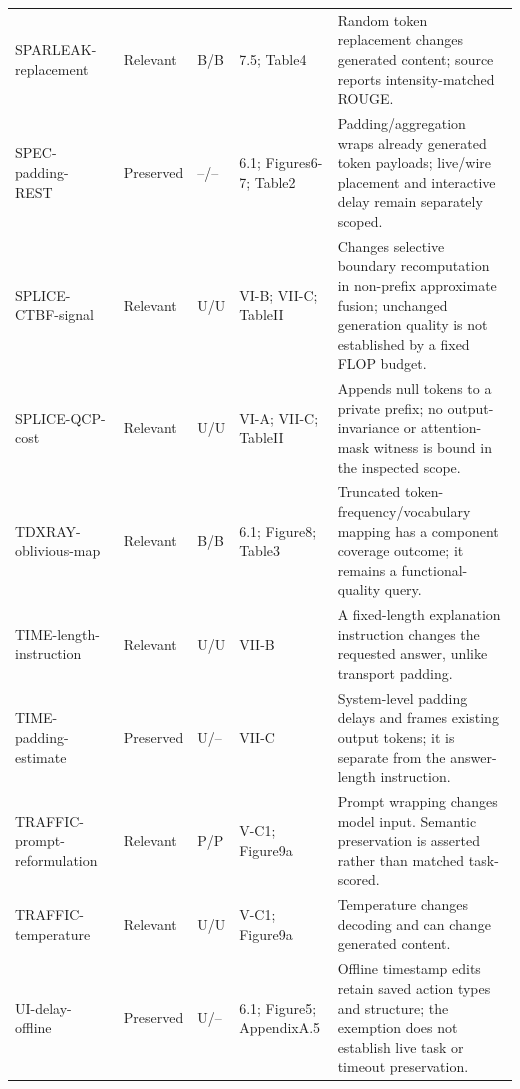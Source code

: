 \begin{longtable}{@{}p{}p{}p{}p{}p{}@{}}
SPARLEAK-\allowbreak{}replacement~\cite{chen2026sparleak} & Relevant & B/B & 7.5; Table4 & Random token replacement changes generated content; source reports intensity-matched ROUGE.\\
SPEC-\allowbreak{}padding-\allowbreak{}REST~\cite{wei2024speculation} & Preserved & --/-- & 6.1; Figures6-7; Table2 & Padding/aggregation wraps already generated token payloads; live/wire placement and interactive delay remain separately scoped.\\
SPLICE-\allowbreak{}CTBF-\allowbreak{}signal~\cite{spliceleak2026} & Relevant & U/U & VI-B; VII-C; TableII & Changes selective boundary recomputation in non-prefix approximate fusion; unchanged generation quality is not established by a fixed FLOP budget.\\
SPLICE-\allowbreak{}QCP-\allowbreak{}cost~\cite{spliceleak2026} & Relevant & U/U & VI-A; VII-C; TableII & Appends null tokens to a private prefix; no output-invariance or attention-mask witness is bound in the inspected scope.\\
TDXRAY-\allowbreak{}oblivious-\allowbreak{}map~\cite{hornetz2026tdxray} & Relevant & B/B & 6.1; Figure8; Table3 & Truncated token-frequency/vocabulary mapping has a component coverage outcome; it remains a functional-quality query.\\
TIME-\allowbreak{}length-\allowbreak{}instruction~\cite{timewilltell2024} & Relevant & U/U & VII-B & A fixed-length explanation instruction changes the requested answer, unlike transport padding.\\
TIME-\allowbreak{}padding-\allowbreak{}estimate~\cite{timewilltell2024} & Preserved & U/-- & VII-C & System-level padding delays and frames existing output tokens; it is separate from the answer-length instruction.\\
TRAFFIC-\allowbreak{}prompt-\allowbreak{}reformulation~\cite{pouryousef2026traffic} & Relevant & P/P & V-C1; Figure9a & Prompt wrapping changes model input. Semantic preservation is asserted rather than matched task-scored.\\
TRAFFIC-\allowbreak{}temperature~\cite{pouryousef2026traffic} & Relevant & U/U & V-C1; Figure9a & Temperature changes decoding and can change generated content.\\
UI-\allowbreak{}delay-\allowbreak{}offline~\cite{uitraces2026} & Preserved & U/-- & 6.1; Figure5; AppendixA.5 & Offline timestamp edits retain saved action types and structure; the exemption does not establish live task or timeout preservation.\\

\end{longtable}
